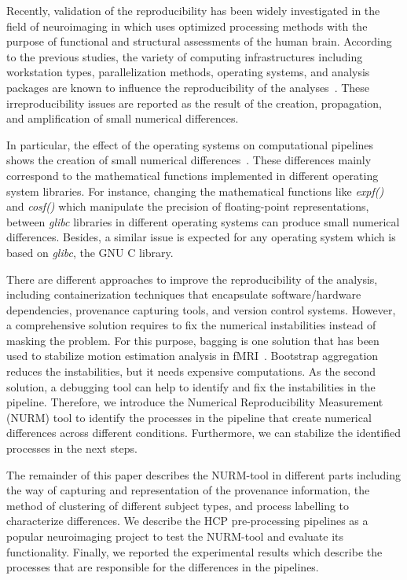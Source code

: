 \documentclass[a4paper,num-refs]{oup-contemporary}
\begin{document}
Recently, validation of the reproducibility has been widely investigated 
in the field of neuroimaging in which uses optimized 
processing methods with the purpose of functional and structural 
assessments of the human brain.
According to the previous 
studies, the variety of computing infrastructures including workstation 
types, parallelization methods, operating systems, and analysis 
packages are known to influence the reproducibility of the analyses~\cite{Gronenschild2012, 
diethelm2012limits, Glatard2015, bowring2019exploring}.
These irreproducibility issues are reported as the result of the 
creation, propagation, and amplification of small numerical 
differences.

In particular, the effect of the operating systems on  
computational pipelines shows the creation of small numerical differences~\cite{Glatard2015, Scaria2017}.
These differences mainly correspond to the mathematical functions implemented 
in different operating system libraries.
For instance, changing the mathematical functions like \emph{expf()} and 
\emph{cosf()} which manipulate the precision of floating-point representations, 
between \emph{glibc} libraries in different operating systems can produce 
small numerical differences.
Besides, a similar issue is expected for any operating system which is 
based on \emph{glibc}, the GNU C library.

There are different approaches to improve the reproducibility of the analysis, 
including containerization techniques that encapsulate software/hardware dependencies, 
provenance capturing tools, and version control systems. 
However, a comprehensive solution requires to fix the numerical instabilities instead of 
masking the problem. For this purpose, bagging is one solution that has been used to 
stabilize motion estimation analysis in fMRI~\cite{Glatard2018hbm}. 
Bootstrap aggregation reduces the instabilities, but it needs expensive computations.
As the second solution, a debugging tool can help to identify and 
fix the instabilities in the pipeline. Therefore, we introduce 
the Numerical Reproducibility Measurement (NURM) tool to identify 
the processes in the pipeline that create numerical differences across different conditions. 
Furthermore, we can stabilize the identified processes in the next steps.

The remainder of this paper describes the NURM-tool in different parts 
including the way of capturing and representation of the provenance 
information, the method of clustering of different subject types, and 
process labelling to characterize differences. We describe the HCP 
pre-processing pipelines as a popular neuroimaging project to test the 
NURM-tool and evaluate its functionality. Finally, we reported the 
experimental results which describe the processes that are responsible 
for the differences in the pipelines.
\end{document}
